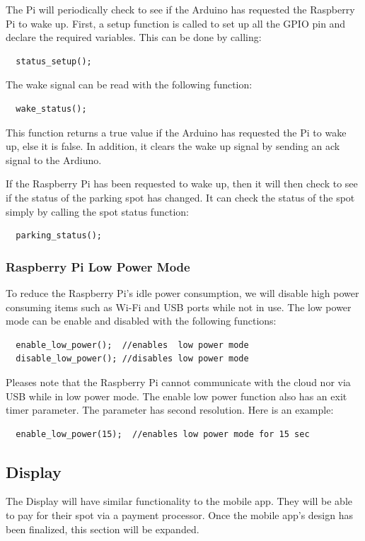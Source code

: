 \documentclass[paper=a4, fontsize=12pt]{scrartcl}
\numberwithin{equation}{section}		%
\numberwithin{figure}{section}			%
\numberwithin{table}{section}				%
\begin{document}
The Pi will periodically check to see if the Arduino has requested the Raspberry Pi to wake up. First, a setup function is called to set up all the GPIO pin and declare the required variables. This can be done by calling:
\begin{verbatim}
  status_setup();
\end{verbatim}
\noindent
The wake signal can be read with the following function:
\begin{verbatim}
  wake_status();
\end{verbatim}
\noindent
This function returns a true value if the Arduino has requested the Pi to wake up, else it is false. In addition, it clears the wake up signal by sending an ack signal to the Ardiuno.

If the Raspberry Pi has been requested to wake up, then it will then check to see if the status of the parking spot has changed. It can check the status of the spot simply by calling the spot status function:
\begin{verbatim}
  parking_status();
\end{verbatim}

\subsubsection{Raspberry Pi Low Power Mode}

To reduce the Raspberry Pi's idle power consumption, we will disable high power consuming items such as Wi-Fi and USB ports while not in use. The low power mode can be enable and disabled with the following functions:
\begin{verbatim}
  enable_low_power();  //enables  low power mode
  disable_low_power(); //disables low power mode
\end{verbatim}
\noindent
Pleases note that the Raspberry Pi cannot communicate with the cloud nor via USB while in low power mode. The enable low power function also has an exit timer parameter. The parameter has second resolution. Here is an example:     %
\begin{verbatim}
  enable_low_power(15);  //enables low power mode for 15 sec
\end{verbatim}

\subsection{Display}

The Display will have similar functionality to the mobile app. They will be able to pay for their spot via a payment processor. Once the mobile app's design has been finalized, this section will be expanded. 
\end{document}
